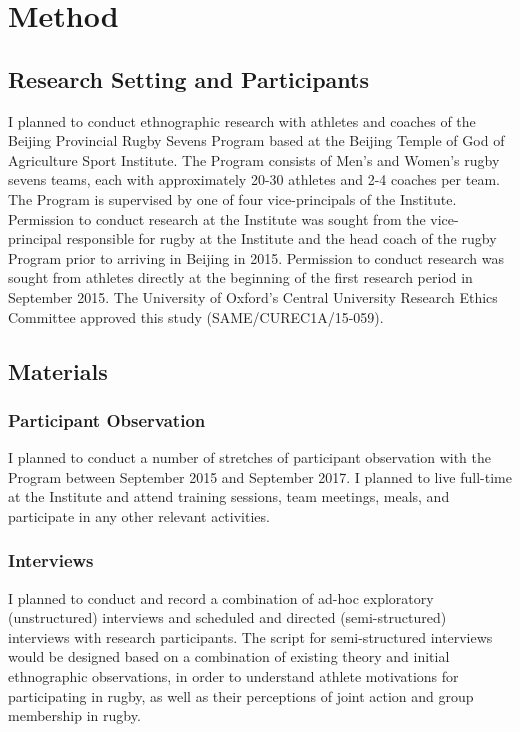 \section{Method}




\subsection{Research Setting and Participants}

I planned to conduct ethnographic research with athletes and coaches of the Beijing Provincial Rugby Sevens Program based at the Beijing Temple of God of Agriculture Sport Institute.  The Program consists of Men's and Women's rugby sevens teams, each with approximately 20-30 athletes and 2-4 coaches per team.  The Program is supervised by one of four vice-principals of the Institute.   Permission to conduct research at the Institute was sought from the vice-principal responsible for rugby at the Institute and the head coach of the rugby Program prior to arriving in Beijing in 2015.  Permission to conduct research was sought from athletes directly at the beginning of the first research period in September 2015. The University of Oxford’s Central University Research Ethics Committee approved this study (SAME/CUREC1A/15-059).

\subsection{Materials}

  \subsubsection{Participant Observation}
  I planned to conduct a number of stretches of participant observation with the Program between September 2015 and September 2017.  I planned to live full-time at the Institute and attend training sessions, team meetings, meals, and participate in any other relevant activities.

  \subsubsection{Interviews}
  I planned to conduct and record a combination of ad-hoc exploratory (unstructured) interviews and scheduled and directed (semi-structured) interviews with research participants.  The script for semi-structured interviews would be designed based on a combination of existing theory and initial ethnographic observations, in order to  understand athlete motivations for participating in rugby, as well as their perceptions of joint action and group membership in rugby.


